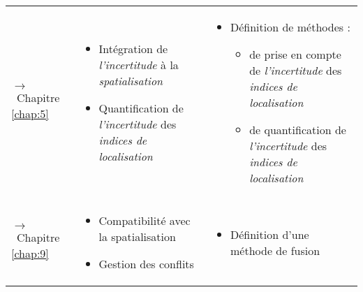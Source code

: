 \begin{tabular}{L{.2\textheight}L{.35\textheight}L{.35\textheight}}
{\par\footnotesize\hspace{.25cm}$\longrightarrow$~Chapitre
\ref{chap:5}} & \begin{minipage}{.35\textheight}
    \begin{itemize}
    \item Intégration de \emph{l'incertitude} à la
      \emph{spatialisation}
    \item Quantification de \emph{l'incertitude} des \emph{indices de
        localisation}
    \end{itemize}
  \end{minipage}& \begin{minipage}{.35\textheight}
    \begin{itemize}
    \item Définition de méthodes :
      \begin{itemize}
      \item de prise en compte de \emph{l’incertitude} des
        \emph{indices de localisation}
      \item de quantification de \emph{l'incertitude} des
        \emph{indices de localisation}
      \end{itemize}
    \end{itemize}  \bigskip
  \end{minipage} \\

{\par\footnotesize\hspace{.25cm}$\longrightarrow$~Chapitre
\ref{chap:9}} & \begin{minipage}{.35\textheight}
    \begin{itemize}
    \item Compatibilité avec la spatialisation
    \item Gestion des conflits
    \end{itemize}
  \end{minipage}& \begin{minipage}{.35\textheight}
    \begin{itemize}
    \item Définition d'une méthode de fusion
    \end{itemize}
  \end{minipage} \\
  

\end{tabular}
